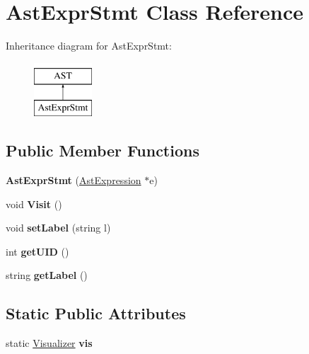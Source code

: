 \hypertarget{classAstExprStmt}{\section{Ast\-Expr\-Stmt Class Reference}
\label{classAstExprStmt}
}
Inheritance diagram for Ast\-Expr\-Stmt\-:\begin{figure}[H]
\begin{center}
\leavevmode
\includegraphics[height=2.000000cm]{classAstExprStmt}
\end{center}
\end{figure}
\subsection*{Public Member Functions}
\begin{DoxyCompactItemize}
\item 
\hypertarget{classAstExprStmt_a1ae9430bd6b1d01b6e3df6924012af56}{{\bfseries Ast\-Expr\-Stmt} (\hyperlink{classAstExpression}{Ast\-Expression} $\ast$e)}\label{classAstExprStmt_a1ae9430bd6b1d01b6e3df6924012af56}

\item 
\hypertarget{classAstExprStmt_aa6763a98f7659d35edf7cf60557609b2}{void {\bfseries Visit} ()}\label{classAstExprStmt_aa6763a98f7659d35edf7cf60557609b2}

\item 
\hypertarget{classAST_a71d680856e95ff89f55d5311a552eba6}{void {\bfseries set\-Label} (string l)}\label{classAST_a71d680856e95ff89f55d5311a552eba6}

\item 
\hypertarget{classAST_ab7a5b1d9f1c2de0d98deb356f724a42c}{int {\bfseries get\-U\-I\-D} ()}\label{classAST_ab7a5b1d9f1c2de0d98deb356f724a42c}

\item 
\hypertarget{classAST_aee029be902fffc927d16ccb03eb922ad}{string {\bfseries get\-Label} ()}\label{classAST_aee029be902fffc927d16ccb03eb922ad}

\end{DoxyCompactItemize}
\subsection*{Static Public Attributes}
\begin{DoxyCompactItemize}
\item 
\hypertarget{classAST_aca9e6637209b31e03a09c0d42f29bdfa}{static \hyperlink{classVisualizer}{Visualizer} {\bfseries vis}}\label{classAST_aca9e6637209b31e03a09c0d42f29bdfa}

\end{DoxyCompactItemize}
